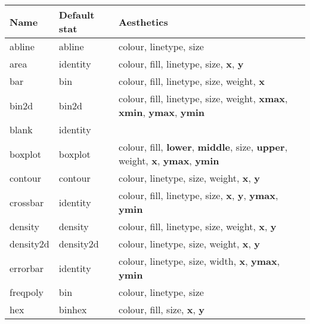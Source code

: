 \begin{table}
  \begin{center}
  \begin{tabular}{llp{3in}}
  \toprule
  Name & Default stat & Aesthetics \\
  \midrule
  abline     & abline    & colour, linetype, size                                                                                                     \\
  area       & identity  & colour, fill, linetype, size, \textbf{x}, \textbf{y}                                                                     \\
  bar        & bin       & colour, fill, linetype, size, weight, \textbf{x}                                                                          \\
  bin2d      & bin2d     & colour, fill, linetype, size, weight, \textbf{xmax}, \textbf{xmin}, \textbf{ymax}, \textbf{ymin}                       \\
  blank      & identity  &                                                                                                                            \\
  boxplot    & boxplot   & colour, fill, \textbf{lower}, \textbf{middle}, size, \textbf{upper}, weight, \textbf{x}, \textbf{ymax}, \textbf{ymin}\\
  contour    & contour   & colour, linetype, size, weight, \textbf{x}, \textbf{y}                                                                   \\
  crossbar   & identity  & colour, fill, linetype, size, \textbf{x}, \textbf{y}, \textbf{ymax}, \textbf{ymin}                                     \\
  density    & density   & colour, fill, linetype, size, weight, \textbf{x}, \textbf{y}                                                             \\
  density2d  & density2d & colour, linetype, size, weight, \textbf{x}, \textbf{y}                                                                   \\
  errorbar   & identity  & colour, linetype, size, width, \textbf{x}, \textbf{ymax}, \textbf{ymin}                                                 \\
  freqpoly   & bin       & colour, linetype, size                                                                                                     \\
  hex        & binhex    & colour, fill, size, \textbf{x}, \textbf{y}                                                                               \\

\end{tabular}
\end{center}
\end{table}
